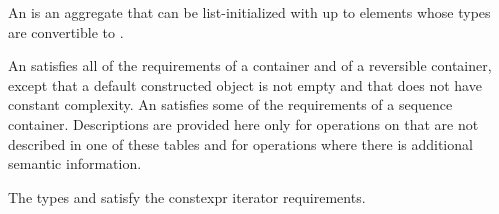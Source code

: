\pnum
{}%
%
An  is an aggregate that can be
list-initialized with up
to  elements whose types are convertible to .

\pnum
{}%
An  satisfies all of the requirements of a container and
of a reversible container, except that a default
constructed  object is not empty and that  does not have constant
complexity. An  satisfies some of the requirements of a sequence
container.
Descriptions are provided here
only for operations on  that are not described in
one of these tables and
for operations where there is additional semantic information.

\pnum
The types  and  satisfy
the constexpr iterator requirements.

